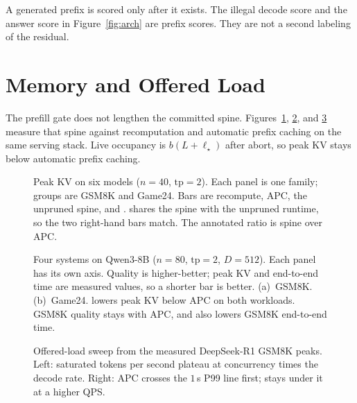 A generated prefix is scored only after it exists.
The illegal decode score and the answer score in Figure~\ref{fig:arch} are prefix scores.
They are not a second labeling of the residual.

\section{Memory and Offered Load}
\label{app:spine}

\clearpage
The prefill gate does not lengthen the committed spine.
Figures~\ref{fig:eval-multi}, \ref{fig:eval-radar}, and \ref{fig:eval-slo} measure that spine against recomputation and automatic prefix caching on the same serving stack.
Live occupancy is $b(L+\ell_{\star})$ after abort, so peak KV stays below automatic prefix caching.

\begin{figure}[t]
\centering
\resizebox{\textwidth}{!}{}
\caption{Peak KV on six models ($n{=}40$, $\mathrm{tp}{=}2$).
Each panel is one family; groups are GSM8K and Game24.
Bars are recompute, APC, the unpruned spine, and \sys.
\sys shares the spine with the unpruned runtime, so the two right-hand bars match.
The annotated ratio is spine over APC.}
\label{fig:eval-multi}
\end{figure}

\begin{figure}[t]
\centering
\resizebox{\textwidth}{!}{}
\caption{Four systems on Qwen3-8B ($n{=}80$, $\mathrm{tp}{=}2$, $D{=}512$).
Each panel has its own axis.
Quality is higher-better; peak KV and end-to-end time are measured values, so a shorter bar is better.
(a)~GSM8K. (b)~Game24.
\sys lowers peak KV below APC on both workloads.
GSM8K quality stays with APC, and \sys also lowers GSM8K end-to-end time.}
\label{fig:eval-radar}
\end{figure}

\begin{figure}[t]
\centering
\resizebox{\columnwidth}{!}{}
\caption{Offered-load sweep from the measured DeepSeek-R1 GSM8K peaks.
Left: saturated tokens per second plateau at concurrency times the decode rate.
Right: APC crosses the $1$\,s P99 line first; \sys stays under it at a higher QPS.}
\label{fig:eval-slo}
\end{figure}


